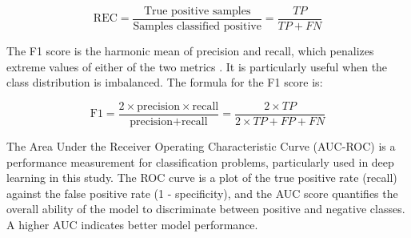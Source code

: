 \begin{equation}
	\text{REC} = \frac{\text{True positive samples}}{\text{Samples classified positive}} = \frac{TP}{TP + FN}
	\label{eq:rec}
\end{equation}

The F1 score is the harmonic mean of precision and recall, which penalizes extreme values of either of the two metrics \cite{cui2020}. It is particularly useful when the class distribution is imbalanced. The formula for the F1 score is:

\begin{equation}
	\text{F1} = \frac{2 \times \text{precision} \times \text{recall}}{\text{precision} + \text{recall}} = \frac{2 \times TP}{2 \times TP + FP + FN}
	\label{eq:f1}
\end{equation}

The Area Under the Receiver Operating Characteristic Curve (AUC-ROC) is a performance measurement for classification problems, particularly used in deep learning in this study. The ROC curve is a plot of the true positive rate (recall) against the false positive rate (1 - specificity), and the AUC score quantifies the overall ability of the model to discriminate between positive and negative classes. A higher AUC indicates better model performance. \cite{nahm2022} 